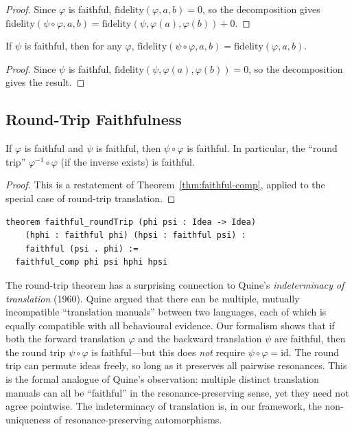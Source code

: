 \begin{proof}
Since $\varphi$ is faithful, $\mathrm{fidelity}(\varphi, a, b) = 0$, so
the decomposition gives
$\mathrm{fidelity}(\psi \circ \varphi, a, b) =
 \mathrm{fidelity}(\psi, \varphi(a), \varphi(b)) + 0$.
\end{proof}

\begin{theorem}
\label{thm:chain-faithful-second}
If $\psi$ is faithful, then for any $\varphi$,
$\mathrm{fidelity}(\psi \circ \varphi, a, b) =
 \mathrm{fidelity}(\varphi, a, b)$.
\end{theorem}

\begin{proof}
Since $\psi$ is faithful, $\mathrm{fidelity}(\psi, \varphi(a), \varphi(b)) = 0$,
so the decomposition gives the result.
\end{proof}

\subsection{Round-Trip Faithfulness}

\begin{theorem}
\label{thm:faithful-roundtrip}
If $\varphi$ is faithful and $\psi$ is faithful, then
$\psi \circ \varphi$ is faithful.
In particular, the ``round trip'' $\varphi^{-1} \circ \varphi$
(if the inverse exists) is faithful.
\end{theorem}

\begin{proof}
This is a restatement of Theorem~\ref{thm:faithful-comp}, applied to the
special case of round-trip translation.
\end{proof}

\begin{lstlisting}
theorem faithful_roundTrip (phi psi : Idea -> Idea)
    (hphi : faithful phi) (hpsi : faithful psi) :
    faithful (psi . phi) :=
  faithful_comp phi psi hphi hpsi
\end{lstlisting}

\begin{interpretation}
\label{int:roundtrip-quine}
The round-trip theorem has a surprising connection to Quine's
\emph{indeterminacy of translation} (1960).  Quine argued that there can be
multiple, mutually incompatible ``translation manuals'' between two languages,
each of which is equally compatible with all behavioural evidence.  Our
formalism shows that if both the forward translation $\varphi$ and the
backward translation $\psi$ are faithful, then the round trip $\psi \circ
\varphi$ is faithful---but this does \emph{not} require $\psi \circ \varphi
= \mathrm{id}$.  The round trip can permute ideas freely, so long as it
preserves all pairwise resonances.  This is the formal analogue of Quine's
observation: multiple distinct translation manuals can all be ``faithful''
in the resonance-preserving sense, yet they need not agree pointwise.
The indeterminacy of translation is, in our framework, the non-uniqueness
of resonance-preserving automorphisms.
\end{interpretation}

